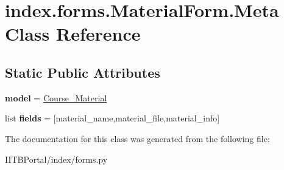 \hypertarget{classindex_1_1forms_1_1MaterialForm_1_1Meta}{}\section{index.\+forms.\+Material\+Form.\+Meta Class Reference}
\label{classindex_1_1forms_1_1MaterialForm_1_1Meta}
\subsection*{Static Public Attributes}
\begin{DoxyCompactItemize}
\item 
\mbox{\label{classindex_1_1forms_1_1MaterialForm_1_1Meta_a5f15124aab90fcaab61e178e0f33507d}} 
{\bfseries model} = \hyperlink{classindex_1_1models_1_1Course__Material}{Course\+\_\+\+Material}
\item 
\mbox{\label{classindex_1_1forms_1_1MaterialForm_1_1Meta_ac2df8daffbb3dab053a904904a8b7ece}} 
list {\bfseries fields} = \mbox{[}\textquotesingle{}material\+\_\+name\textquotesingle{},\textquotesingle{}material\+\_\+file\textquotesingle{},\textquotesingle{}material\+\_\+info\textquotesingle{}\mbox{]}
\end{DoxyCompactItemize}


The documentation for this class was generated from the following file\+:\begin{DoxyCompactItemize}
\item 
I\+I\+T\+B\+Portal/index/forms.\+py\end{DoxyCompactItemize}

